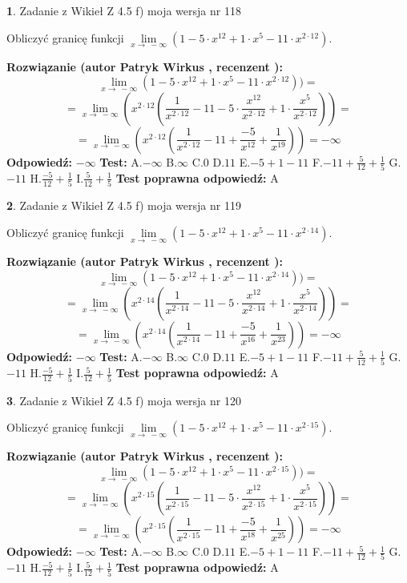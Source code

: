 \documentclass[12pt, a4paper]{article}
\theoremstyle{definition} %
\newtheorem{zad}{}
\newcommand{\zadStart}[1]{\begin{zad}#1\newline}
\newcommand{\zadStop}{\end{zad}}
\newcommand{\rozwStart}[2]{\noindent \textbf{Rozwiązanie (autor #1 , recenzent #2): }\newline}
\newcommand{\rozwStop}{\newline}
\newcommand{\odpStart}{\noindent \textbf{Odpowiedź:}\newline}
\newcommand{\odpStop}{\newline}
\newcommand{\testStart}{\noindent \textbf{Test:}\newline}
\newcommand{\testStop}{\newline}
\newcommand{\kluczStart}{\noindent \textbf{Test poprawna odpowiedź:}\newline}
\newcommand{\kluczStop}{\newline}
\begin{document}
\zadStart{Zadanie z Wikieł Z 4.5 f) moja wersja nr 118}



Obliczyć granicę funkcji  $\lim\limits_{x\to\ -\infty}(1 - 5 \cdot x^{12}+1 \cdot x^{5}- 11 \cdot x^{2\cdot12})$.
\zadStop
\rozwStart{Patryk Wirkus}{}
$$\lim\limits_{x\to\ -\infty}(1 - 5 \cdot x^{12}+1 \cdot x^{5}- 11 \cdot x^{2\cdot12}))=$$
$$=\lim\limits_{x\to\ -\infty}(x^{2\cdot12}(\frac{1}{x^{2\cdot12}}-11 -5 \cdot \frac{x^{12}}{x^{2\cdot12}}+1 \cdot \frac{x^{5}}{x^{2\cdot12}}))=$$
$$=\lim\limits_{x\to\ -\infty}(x^{2\cdot12}(\frac{1}{x^{2\cdot12}}-11 + \frac{-5}{x^{12}}+ \frac{1}{x^{19}}))=-\infty$$
\rozwStop
\odpStart
$-\infty$
\odpStop
\testStart
A.$-\infty$ B.$\infty$ C.$0$ D.$11$ E.$-5 + 1 - 11$
F.$-11+\frac{5}{12}+\frac{1}{5}$ G.$-11$
H.$\frac{-5}{12}+\frac{1}{5}$
I.$\frac{5}{12}+\frac{1}{5}$
\testStop
\kluczStart
A
\kluczStop



\zadStart{Zadanie z Wikieł Z 4.5 f) moja wersja nr 119}



Obliczyć granicę funkcji  $\lim\limits_{x\to\ -\infty}(1 - 5 \cdot x^{12}+1 \cdot x^{5}- 11 \cdot x^{2\cdot14})$.
\zadStop
\rozwStart{Patryk Wirkus}{}
$$\lim\limits_{x\to\ -\infty}(1 - 5 \cdot x^{12}+1 \cdot x^{5}- 11 \cdot x^{2\cdot14}))=$$
$$=\lim\limits_{x\to\ -\infty}(x^{2\cdot14}(\frac{1}{x^{2\cdot14}}-11 -5 \cdot \frac{x^{12}}{x^{2\cdot14}}+1 \cdot \frac{x^{5}}{x^{2\cdot14}}))=$$
$$=\lim\limits_{x\to\ -\infty}(x^{2\cdot14}(\frac{1}{x^{2\cdot14}}-11 + \frac{-5}{x^{16}}+ \frac{1}{x^{23}}))=-\infty$$
\rozwStop
\odpStart
$-\infty$
\odpStop
\testStart
A.$-\infty$ B.$\infty$ C.$0$ D.$11$ E.$-5 + 1 - 11$
F.$-11+\frac{5}{12}+\frac{1}{5}$ G.$-11$
H.$\frac{-5}{12}+\frac{1}{5}$
I.$\frac{5}{12}+\frac{1}{5}$
\testStop
\kluczStart
A
\kluczStop



\zadStart{Zadanie z Wikieł Z 4.5 f) moja wersja nr 120}



Obliczyć granicę funkcji  $\lim\limits_{x\to\ -\infty}(1 - 5 \cdot x^{12}+1 \cdot x^{5}- 11 \cdot x^{2\cdot15})$.
\zadStop
\rozwStart{Patryk Wirkus}{}
$$\lim\limits_{x\to\ -\infty}(1 - 5 \cdot x^{12}+1 \cdot x^{5}- 11 \cdot x^{2\cdot15}))=$$
$$=\lim\limits_{x\to\ -\infty}(x^{2\cdot15}(\frac{1}{x^{2\cdot15}}-11 -5 \cdot \frac{x^{12}}{x^{2\cdot15}}+1 \cdot \frac{x^{5}}{x^{2\cdot15}}))=$$
$$=\lim\limits_{x\to\ -\infty}(x^{2\cdot15}(\frac{1}{x^{2\cdot15}}-11 + \frac{-5}{x^{18}}+ \frac{1}{x^{25}}))=-\infty$$
\rozwStop
\odpStart
$-\infty$
\odpStop
\testStart
A.$-\infty$ B.$\infty$ C.$0$ D.$11$ E.$-5 + 1 - 11$
F.$-11+\frac{5}{12}+\frac{1}{5}$ G.$-11$
H.$\frac{-5}{12}+\frac{1}{5}$
I.$\frac{5}{12}+\frac{1}{5}$
\testStop
\kluczStart
A
\kluczStop
\end{document}
